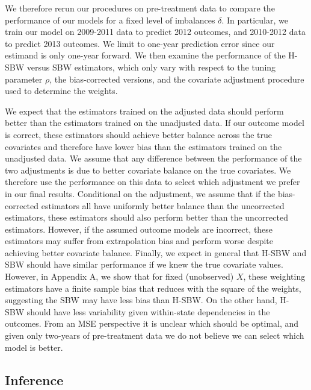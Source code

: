 We therefore rerun our procedures on pre-treatment data to compare the performance of our models for a fixed level of imbalances $\delta$. In particular, we train our model on 2009-2011 data to predict 2012 outcomes, and 2010-2012 data to predict 2013 outcomes. We limit to one-year prediction error since our estimand is only one-year forward. We then examine the performance of the H-SBW versus SBW estimators, which only vary with respect to the tuning parameter $\rho$, the bias-corrected versions, and the covariate adjustment procedure used to determine the weights. 

We expect that the estimators trained on the adjusted data should perform better than the estimators trained on the unadjusted data. If our outcome model is correct, these estimators should achieve better balance across the true covariates and therefore have lower bias than the estimators trained on the unadjusted data. We assume that any difference between the performance of the two adjustments is due to better covariate balance on the true covariates. We therefore use the performance on this data to select which adjustment we prefer in our final results. Conditional on the adjustment, we assume that if the bias-corrected estimators all have uniformly better balance than the uncorrected estimators, these estimators should also perform better than the uncorrected estimators. However, if the assumed outcome models are incorrect, these estimators may suffer from extrapolation bias and perform worse despite achieving better covariate balance. Finally, we expect in general that H-SBW and SBW should have similar performance if we knew the true covariate values. However, in Appendix A, we show that for fixed (unobserved) $X$, these weighting estimators have a finite sample bias that reduces with the square of the weights, suggesting the SBW may have less bias than H-SBW. On the other hand, H-SBW should have less variability given within-state dependencies in the outcomes. From an MSE perspective it is unclear which should be optimal, and given only two-years of pre-treatment data we do not believe we can select which model is better.

\subsection{Inference}

